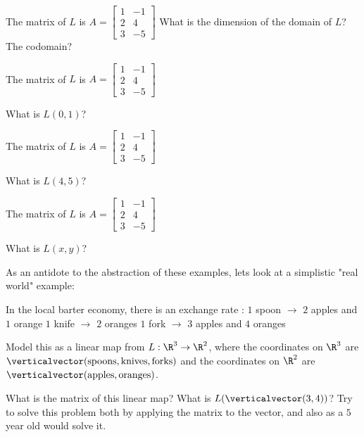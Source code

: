 	\begin{question}
		The matrix of $L$ is 
		$A = \begin{bmatrix}
		1&-1\\2&4\\3&-5
		\end{bmatrix}$
		What is the dimension of the domain of  $L$?  The codomain?
	\end{question}
	
	\begin{question}
		The matrix of $L$ is 
		$A = \begin{bmatrix}
		1&-1\\2&4\\3&-5
		\end{bmatrix}$
		
		What is $L(0,1)$?
	\end{question}
	
	\begin{question}
		The matrix of $L$ is 
		$A = \begin{bmatrix}
		1&-1\\2&4\\3&-5
		\end{bmatrix}$
		
		What is $L(4,5)$?
	\end{question}
	
	\begin{question}
		The matrix of $L$ is 
		$A = \begin{bmatrix}
		1&-1\\2&4\\3&-5
		\end{bmatrix}$
		
		What is $L(x,y)$?
	\end{question}
	
	As an antidote to the abstraction of these examples, lets look at a simplistic "real world" example:
	
	\begin{question}
		In the local barter economy, there is an exchange rate :
			 $1$ spoon $\to$ $2$ apples and $1$ orange
			 $1$ knife $\to$  $2$ oranges
			 $1$ fork $\to$  $3$ apples and $4$ oranges
			 
			 Model this as a linear map from $L:\R^3 \to \R^2$, where the coordinates on $\R^3$ are $\verticalvector(\text{spoons},\text{knives},\text{forks}) $ and the coordinates on $\R^2$ are
			 $\verticalvector(\text{apples},\text{oranges})$.
			 
			 What is the matrix of this linear map?  
			 What is $L(\verticalvector(3,4))$?  Try to solve  this problem both by applying the matrix to the vector, and also as a $5$ year old would solve it. 
	\end{question} 

